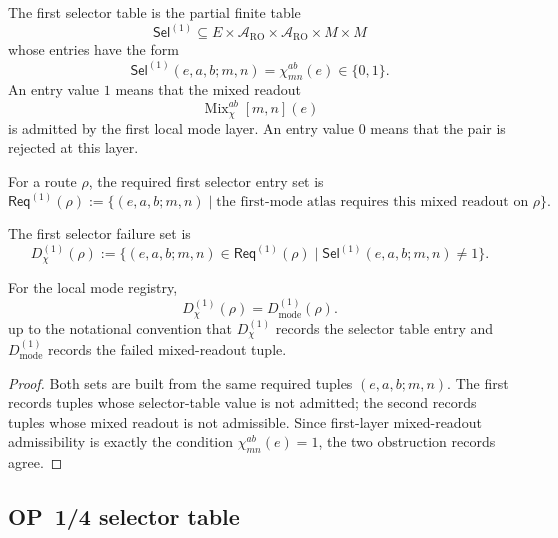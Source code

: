 \begin{definition}
\label{def:v410r21-first-selector-table}
The first selector table is the partial finite table
\[
 \mathsf{Sel}^{(1)}
 \subseteq
 E\times\mathcal A_{\mathrm{RO}}\times\mathcal A_{\mathrm{RO}}
 \times M\times M
\]
whose entries have the form
\[
 \mathsf{Sel}^{(1)}(e,a,b;m,n)
 =
 \chi^{ab}_{mn}(e)
 \in\{0,1\}.
\]
An entry value \(1\) means that the mixed readout
\[
 \operatorname{Mix}_{\chi}^{ab}[m,n](e)
\]
is admitted by the first local mode layer. An entry value \(0\) means that the
pair is rejected at this layer.
\end{definition}

\begin{definition}
\label{def:v410r21-required-first-selector-entries}
For a route \(\rho\), the required first selector entry set is
\[
 \mathsf{Req}^{(1)}(\rho)
 :=
 \{(e,a,b;m,n)\mid
 \text{the first-mode atlas requires this mixed readout on }\rho\}.
\]
\end{definition}

\begin{definition}
\label{def:v410r21-first-selector-failure-set}
The first selector failure set is
\[
 D_{\chi}^{(1)}(\rho)
 :=
 \{(e,a,b;m,n)\in \mathsf{Req}^{(1)}(\rho)\mid
 \mathsf{Sel}^{(1)}(e,a,b;m,n)\neq 1\}.
\]
\end{definition}

\begin{lemma}
\label{lem:v410r21-selector-table-equals-first-mode-diagnostic}
For the local mode registry,
\[
 D_{\chi}^{(1)}(\rho)=D_{\mathrm{mode}}^{(1)}(\rho).
\]
up to the notational convention that \(D_{\chi}^{(1)}\) records the selector
table entry and \(D_{\mathrm{mode}}^{(1)}\) records the failed mixed-readout
tuple.
\end{lemma}

\begin{proof}
Both sets are built from the same required tuples \((e,a,b;m,n)\). The first
records tuples whose selector-table value is not admitted; the second records
tuples whose mixed readout is not admissible. Since first-layer mixed-readout
admissibility is exactly the condition \(\chi^{ab}_{mn}(e)=1\), the two
obstruction records agree.
\end{proof}

\subsection{OP~1/4 selector table}
\label{subsec:v410r21-op14-selector-table}

